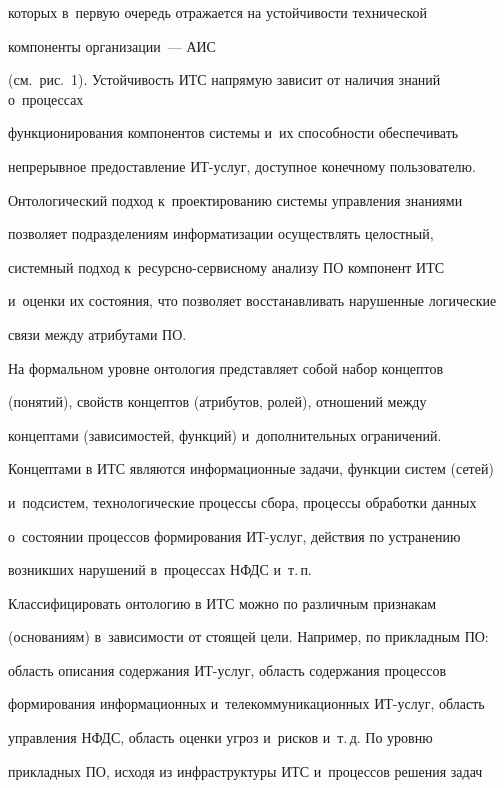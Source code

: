 которых в~первую очередь отражается на устойчивости технической


компоненты организации~--- АИС


(см.\ рис.~1). Устойчивость ИТС напрямую зависит от наличия знаний о~процессах


функционирования компонентов системы и~их спо\-соб\-ности обеспечивать


непрерывное предоставление ИТ-услуг, доступное конечному пользователю.


Онтологический подход к~проектированию системы управления знаниями


позволяет подразделениям информатизации осуществлять целостный,


системный подход к~ре\-сурс\-но-сер\-вис\-но\-му анализу ПО компонент ИТС


и~оценки их состояния, что позволяет восстанавливать нарушенные логические


связи между атрибутами ПО.





  На формальном уровне онтология представляет собой набор концептов


(понятий), свойств концептов (атрибутов, ролей), отношений между


концептами (зависимостей, функций) и~дополнительных ограничений.


Концептами в ИТС являются информационные задачи, функции систем (сетей)


и~подсистем, технологические процессы сбора, процессы обработки данных


о~состоянии процессов формирования ИТ-услуг, действия по устранению


возникших нарушений в~процессах НФДС и~т.\,п.





  Классифицировать онтологию в ИТС можно по различным признакам


(основаниям) в~зависимости от стоящей цели. Например, по прикладным ПО:


область описания содержания ИТ-услуг, область содержания процессов


формирования информационных и~телекоммуникационных ИТ-услуг, область


управления НФДС, область оценки угроз и~рисков и~т.\,д. По уровню


прикладных ПО, исходя из инфраструктуры ИТС и~процессов решения задач


